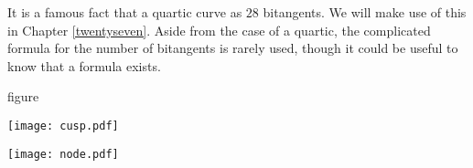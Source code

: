 \documentclass[leqno]{book}
\theoremstyle{definition}%
\numberwithin{equation}{section}
\theoremstyle{theorem} %
\begin{document}
\newpage
\msno 
It is a famous fact that a quartic  curve as $28$
bitangents.  We will make use of this  in Chapter \ref{twentyseven}.
Aside from the case of a quartic, the complicated formula for the
number of bitangents is rarely used, though it could be useful to know
that a formula exists.


\bs
\centerline{figure}

\begin{center}
\texttt{[image: cusp.pdf]}
\end{center}

\begin{center}
\texttt{[image: node.pdf]}
\end{center}
\end{document}
